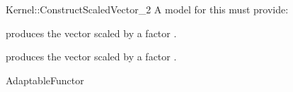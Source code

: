 \begin{ccRefFunctionObjectConcept}{Kernel::ConstructScaledVector_2}
A model for this must provide:



            {produces the vector  scaled by a factor .}

            {produces the vector  scaled by a factor .}


\ccRefines
AdaptableFunctor

\ccSeeAlso
{}\\

\end{ccRefFunctionObjectConcept}
